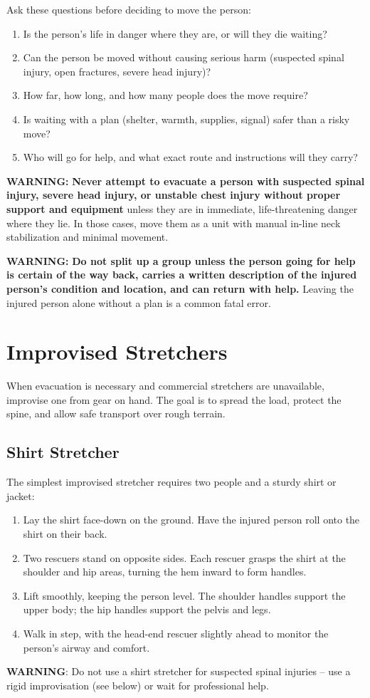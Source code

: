 Ask these questions before deciding to move the person:

\begin{enumerate}[leftmargin=*]
\item Is the person's life in danger where they are, or will they die waiting?
\item Can the person be moved without causing serious harm (suspected spinal injury, open fractures, severe head injury)?
\item How far, how long, and how many people does the move require?
\item Is waiting with a plan (shelter, warmth, supplies, signal) safer than a risky move?
\item Who will go for help, and what exact route and instructions will they carry?
\end{enumerate}

\textbf{WARNING:} \textbf{Never attempt to evacuate a person with suspected spinal injury, severe head injury, or unstable chest injury without proper support and equipment} unless they are in immediate, life-threatening danger where they lie. In those cases, move them as a unit with manual in-line neck stabilization and minimal movement.

\textbf{WARNING:} \textbf{Do not split up a group unless the person going for help is certain of the way back, carries a written description of the injured person's condition and location, and can return with help.} Leaving the injured person alone without a plan is a common fatal error.

\section{Improvised Stretchers}
When evacuation is necessary and commercial stretchers are unavailable, improvise one from gear on hand. The goal is to spread the load, protect the spine, and allow safe transport over rough terrain.

\subsection{Shirt Stretcher}
The simplest improvised stretcher requires two people and a sturdy shirt or jacket:
\begin{enumerate}
  \item Lay the shirt face-down on the ground. Have the injured person roll onto the shirt on their back.
  \item Two rescuers stand on opposite sides. Each rescuer grasps the shirt at the shoulder and hip areas, turning the hem inward to form handles.
  \item Lift smoothly, keeping the person level. The shoulder handles support the upper body; the hip handles support the pelvis and legs.
  \item Walk in step, with the head-end rescuer slightly ahead to monitor the person's airway and comfort.
\end{enumerate}
\textbf{WARNING}: Do not use a shirt stretcher for suspected spinal injuries -- use a rigid improvisation (see below) or wait for professional help.

